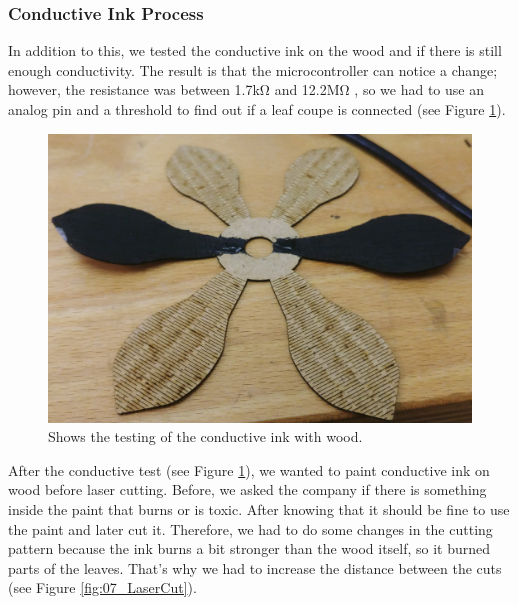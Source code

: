\documentclass[04.3_buildingProcess.tex]{subfiles}
\begin{document}
    \subsubsection{Conductive Ink Process}
    \begin{flushleft}
        \noindent
        In addition to this, we tested the conductive ink on the wood and if there is 
        still enough conductivity. The result is that the microcontroller can notice a 
        change; however, the resistance was between 1.7k\si{\ohm} and 12.2M\si{\ohm} , 
        so we had to use an analog pin and a threshold to find out if a leaf coupe is 
        connected (see Figure \ref{fig:leaveConductiveInk}).

        \begin{figure}[h!]
            \centering
            \includegraphics[scale=0.05]{images/materialProcess/leaveTesting_.jpg}
            \caption{Shows the testing of the conductive ink with wood.}
            \label{fig:leaveConductiveInk}
        \end{figure}

        \noindent
        After the conductive test (see Figure \ref{fig:leaveConductiveInk}), we wanted to paint 
        conductive ink on wood before laser cutting. Before, we asked the company if there is 
        something inside the paint that burns or is toxic. After knowing that it should be fine to 
        use the paint and later cut it. Therefore, we had to do some changes in the cutting pattern
        because the ink burns a bit stronger than the wood itself, so it burned parts of the leaves. 
        That's why we had to increase the distance between the cuts (see Figure \ref{fig:07_LaserCut}). 


\end{flushleft}
\end{document}
